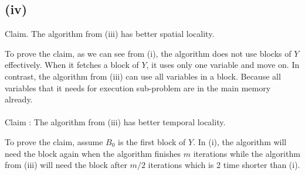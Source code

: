 \subsection*{(iv)}

Claim. The algorithm from (iii) has better spatial locality.

To prove the claim, as we can see from (i), the algorithm does not use blocks of $Y$ effectively. When it fetches a block of $Y$, it uses only one variable and move on. In contrast, the algorithm from (iii) can use all variables in a block. Because all variables that it needs for execution sub-problem are in the main memory already.
\\\\
Claim : The algorithm from (iii) has better temporal locality. 

To prove the claim, assume $B_0$ is the first block of $Y$. In (i), the algorithm will need the block again when the algorithm finishes $m$ iterations while the algorithm from (iii) will need the block after $m/2$ iterations which is 2 time shorter than (i).
